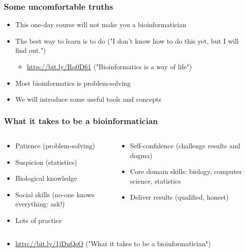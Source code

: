 \documentclass[table]{beamer}
\begin{document}
  \begin{frame}
    \frametitle{Some uncomfortable truths}
    \begin{itemize}
      \item This one-day course will not make you a bioinformatician
      \item The best way to learn is to do ("I don't know how to do this yet, but I will find out.")
      \begin{itemize}
        \item \url{http://bit.ly/Rq0D61} ("Bioinformatics is a way of life")
      \end{itemize}
      \item Most bioinformatics is problem-solving
      \item We will introduce some useful tools and concepts
    \end{itemize}
  \end{frame}

  \begin{frame}
    \frametitle{What it takes to be a bioinformatician}
    \begin{columns}[t]
      \begin{column}{5cm}
        \begin{itemize}
          \item Patience (problem-solving)
          \item Suspicion (statistics)
          \item Biological knowledge
          \item Social skills (no-one knows everything: ask!)
	      \item Lots of practice          
	    \end{itemize}
	  \end{column}
	  \begin{column}{5cm}
	    \begin{itemize}
	      \item Self-confidence (challenge results and dogma)
	      \item Core domain skills: biology, computer science, statistics
	      \item Deliver results (qualified, honest)
	    \end{itemize}
	  \end{column}
	\end{columns}
	\begin{itemize}
	  \item \url{http://bit.ly/1jDuQsO} ("What it takes to be a bioinformatician")
	\end{itemize}
  \end{frame}
\end{document}
